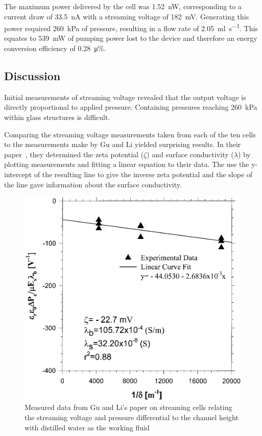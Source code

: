 The maximum power delivered by the cell was \SI{1.52}{\nano\watt}, corresponding to a current draw of \SI{33.5}{\nano\ampere} with a streaming voltage of \SI{182}{\milli\volt}.
Generating this power required \SI{260}{\kilo\pascal} of pressure, resulting in a flow rate of \SI{2.05}{\milli\litre\per\second}.
This equates to \SI{539}{\milli\watt} of pumping power lost to the device and therefore an energy conversion efficiency of \SI{0.28}{\micro\percent}.

\subsection{Discussion}

Initial measurements of streaming voltage revealed that the output voltage is directly proportional to applied pressure.
Containing pressures reaching \SI{260}{\kilo\pascal} within glass structures is difficult.

Comparing the streaming voltage measurements taken from each of the ten cells to the measurements make by Gu and Li yielded surprising results.
In their paper~\cite{Gu2000}, they determined the zeta potential ($\zeta$) and surface conductivity ($\lambda$) by plotting measurements and fitting a linear equation to their data.
The use the y-intercept of the resulting line to give the inverse zeta potential and the slope of the line gave information about the surface conductivity.

\begin{figure}
    \centering
    \includegraphics{content/pt1/01-PowerHarvesting/graphics/GuLi_DIUF}
    \caption{\label{fig:Gu_Li_comparison_DUIF}Measured data from Gu and Li's paper on streaming cells relating the streaming voltage and pressure differential to the channel height with distilled water as the working fluid}
\end{figure}

